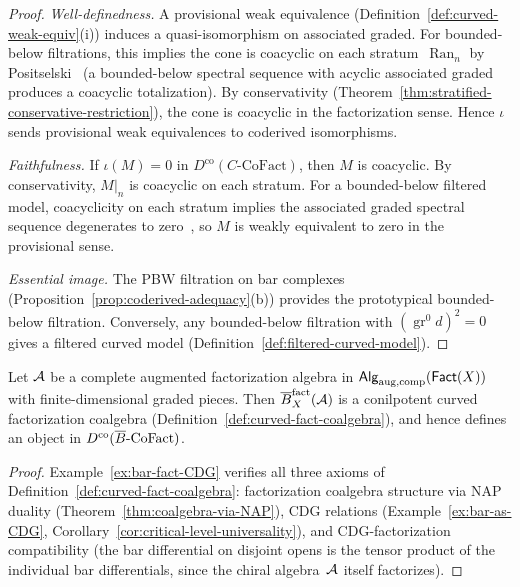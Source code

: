 \begin{proof}
\emph{Well-definedness.}
A provisional weak equivalence
(Definition~\ref{def:curved-weak-equiv}(i)) induces a
quasi-isomorphism on associated graded.  For bounded-below
filtrations, this implies the cone is coacyclic on each
stratum~$\operatorname{Ran}_n$ by
Positselski~\cite[Proposition~3.5]{Positselski11} (a
bounded-below spectral sequence with acyclic associated graded
produces a coacyclic totalization).  By conservativity
(Theorem~\ref{thm:stratified-conservative-restriction}), the cone
is coacyclic in the factorization sense.  Hence $\iota$
sends provisional weak equivalences to coderived isomorphisms.

\emph{Faithfulness.}
If $\iota(M) = 0$ in $D^{\mathrm{co}}(C\text{-}\mathrm{CoFact})$,
then $M$ is coacyclic.  By conservativity, $M|_n$ is coacyclic
on each stratum.  For a bounded-below filtered model, coacyclicity
on each stratum implies the associated graded spectral sequence
degenerates to zero~\cite[Proposition~3.5]{Positselski11}, so
$M$ is weakly equivalent to zero in the provisional sense.

\emph{Essential image.}
The PBW filtration on bar complexes
(Proposition~\ref{prop:coderived-adequacy}(b)) provides the
prototypical bounded-below filtration.  Conversely, any
bounded-below filtration with
$(\operatorname{gr}^0 d)^2 = 0$ gives a filtered curved model
(Definition~\ref{def:filtered-curved-model}).
\end{proof}

\begin{proposition}
\label{prop:bar-ran-well-defined}
Let $\mathcal{A}$ be a complete augmented factorization algebra in
$\mathsf{Alg}_{\mathrm{aug,comp}}(\mathsf{Fact}(X))$ with finite-dimensional
graded pieces.  Then $\overline{B}_X^{\mathrm{fact}}(\mathcal{A})$ is a
conilpotent curved factorization coalgebra
\textup{(}Definition~\textup{\ref{def:curved-fact-coalgebra}}),
and hence defines an object in
$D^{\mathrm{co}}(\overline{B}\text{-}\mathrm{CoFact})$.
\end{proposition}

\begin{proof}
Example~\ref{ex:bar-fact-CDG} verifies all three axioms of
Definition~\ref{def:curved-fact-coalgebra}: factorization
coalgebra structure via NAP duality
(Theorem~\ref{thm:coalgebra-via-NAP}), CDG relations
(Example~\ref{ex:bar-as-CDG},
Corollary~\ref{cor:critical-level-universality}), and
CDG-factorization compatibility (the bar differential on disjoint
opens is the tensor product of the individual bar differentials,
since the chiral algebra~$\mathcal{A}$ itself factorizes).
\end{proof}

